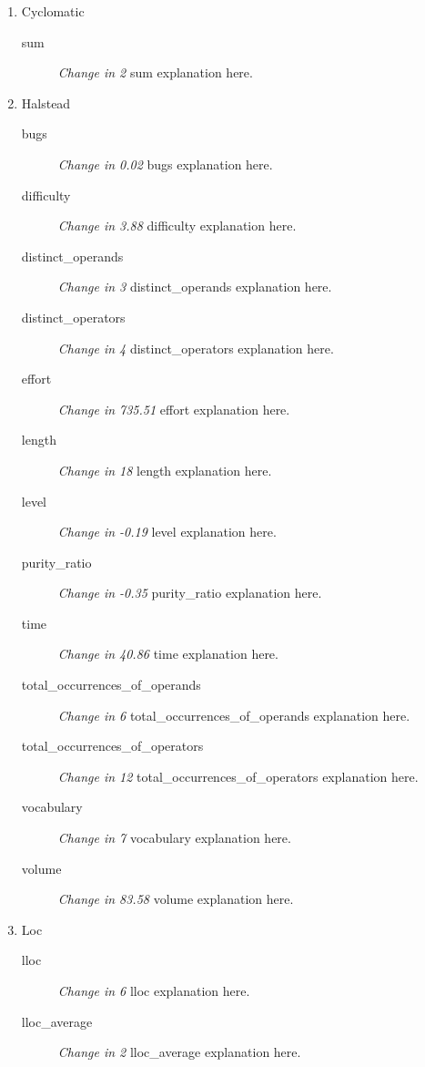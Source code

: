 \begin{enumerate}
      \item Cyclomatic
            \begin{description}
                  \item [sum] \textit{Change in 2} sum explanation here.
            \end{description}
      \item Halstead
            \begin{description}
                  \item [bugs] \textit{Change in 0.02} bugs explanation here.
                  \item [difficulty] \textit{Change in 3.88} difficulty explanation here.
                  \item [distinct\_operands] \textit{Change in 3} distinct\_operands explanation here.
                  \item [distinct\_operators] \textit{Change in 4} distinct\_operators explanation here.
                  \item [effort] \textit{Change in 735.51} effort explanation here.
                  \item [length] \textit{Change in 18} length explanation here.
                  \item [level] \textit{Change in -0.19} level explanation here.
                  \item [purity\_ratio] \textit{Change in -0.35} purity\_ratio explanation here.
                  \item [time] \textit{Change in 40.86} time explanation here.
                  \item [total\_occurrences\_of\_operands] \textit{Change in 6} total\_occurrences\_of\_operands explanation here.
                  \item [total\_occurrences\_of\_operators] \textit{Change in 12} total\_occurrences\_of\_operators explanation here.
                  \item [vocabulary] \textit{Change in 7} vocabulary explanation here.
                  \item [volume] \textit{Change in 83.58} volume explanation here.
            \end{description}
      \item Loc
            \begin{description}
                  \item [lloc] \textit{Change in 6} lloc explanation here.
                  \item [lloc\_average] \textit{Change in 2} lloc\_average explanation here.

\end{description}
\end{enumerate}
